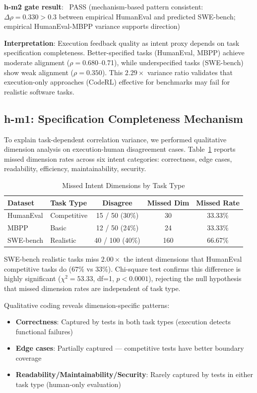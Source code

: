 \textbf{h-m2 gate result}: \checkmark\ PASS (mechanism-based pattern consistent: $\Delta\rho=0.330>0.3$ between empirical HumanEval and predicted SWE-bench; empirical HumanEval-MBPP variance supports direction)

\textbf{Interpretation}: Execution feedback quality as intent proxy depends on task specification completeness. Better-specified tasks (HumanEval, MBPP) achieve moderate alignment ($\rho=0.680$--0.71), while underspecified tasks (SWE-bench) show weak alignment ($\rho=0.350$). This $2.29\times$ variance ratio validates that execution-only approaches (CodeRL) effective for benchmarks may fail for realistic software tasks.

\subsection{h-m1: Specification Completeness Mechanism}

To explain task-dependent correlation variance, we performed qualitative dimension analysis on execution-human disagreement cases. Table~\ref{tab:missed_dimensions} reports missed dimension rates across six intent categories: correctness, edge cases, readability, efficiency, maintainability, security.

\begin{table}[t]
\centering
\caption{Missed Intent Dimensions by Task Type}
\label{tab:missed_dimensions}
\begin{tabular}{llccc}
\hline
Dataset & Task Type & Disagree & Missed Dim & Missed Rate \\
\hline
HumanEval & Competitive & 15 / 50 (30\%) & 30 & 33.33\% \\
MBPP & Basic & 12 / 50 (24\%) & 24 & 33.33\% \\
SWE-bench & Realistic & 40 / 100 (40\%) & 160 & 66.67\% \\
\hline
\end{tabular}
\end{table}

SWE-bench realistic tasks miss $2.00\times$ the intent dimensions that HumanEval competitive tasks do (67\% vs 33\%). Chi-square test confirms this difference is highly significant ($\chi^2=53.33$, df=1, $p<0.0001$), rejecting the null hypothesis that missed dimension rates are independent of task type.

Qualitative coding reveals dimension-specific patterns:
\begin{itemize}
\item \textbf{Correctness}: Captured by tests in both task types (execution detects functional failures)
\item \textbf{Edge cases}: Partially captured --- competitive tests have better boundary coverage
\item \textbf{Readability/Maintainability/Security}: Rarely captured by tests in either task type (human-only evaluation)
\end{itemize}

